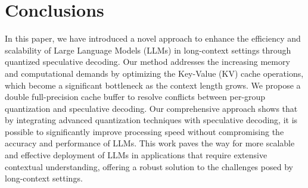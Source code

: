 \section{Conclusions}
In this paper, we have introduced a novel approach to enhance the efficiency and scalability of Large Language Models (LLMs) in long-context settings through quantized speculative decoding. Our method addresses the increasing memory and computational demands by optimizing the Key-Value (KV) cache operations, which become a significant bottleneck as the context length grows. We propose a double full-precision cache buffer to resolve conflicts between per-group quantization and speculative decoding. Our comprehensive approach shows that by integrating advanced quantization techniques with speculative decoding, it is possible to significantly improve processing speed without compromising the accuracy and performance of LLMs. This work paves the way for more scalable and effective deployment of LLMs in applications that require extensive contextual understanding, offering a robust solution to the challenges posed by long-context settings.